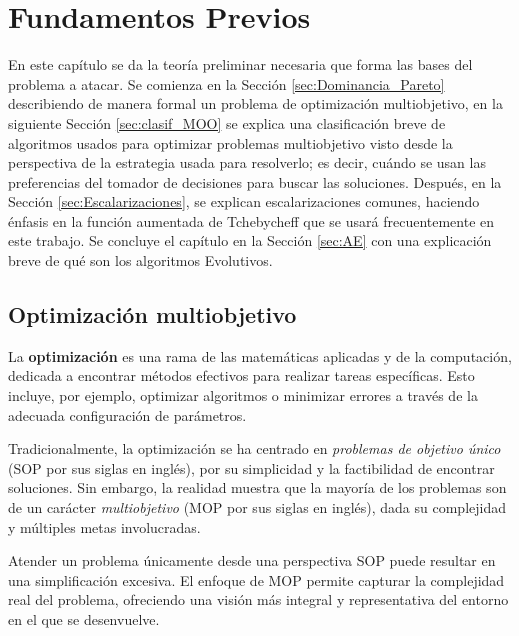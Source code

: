 

\chapter{Fundamentos Previos}

En este capítulo se da la teoría preliminar necesaria que forma las bases del problema a atacar. Se comienza en la Sección \ref{sec:Dominancia_Pareto} describiendo de manera formal un problema de optimización multiobjetivo, en la siguiente Sección \ref{sec:clasif_MOO} se explica una clasificación breve de algoritmos usados para optimizar problemas multiobjetivo visto desde la perspectiva de la estrategia usada para resolverlo; es decir, cuándo se usan las preferencias del tomador de decisiones para buscar las soluciones. Después, en la Sección \ref{sec:Escalarizaciones}, se explican escalarizaciones comunes, haciendo énfasis en la función aumentada de Tchebycheff que se usará frecuentemente en este trabajo. 
Se concluye el capítulo en la Sección \ref{sec:AE} con una explicación breve de qué son los algoritmos Evolutivos.



\section{Optimización multiobjetivo} \label{sec:MOO}



La \textbf{optimización} es una rama de las matemáticas aplicadas y de la computación, dedicada a encontrar métodos efectivos para realizar tareas específicas. Esto incluye, por ejemplo, optimizar algoritmos o minimizar errores a través de la adecuada configuración de parámetros.

Tradicionalmente, la optimización se ha centrado en \textit{problemas de objetivo único} (SOP por sus siglas en inglés), por su simplicidad y la factibilidad de encontrar soluciones. Sin embargo, la realidad muestra que la mayoría de los problemas son de un carácter \textit{multiobjetivo} (MOP por sus siglas en inglés), dada su complejidad y múltiples metas involucradas.

Atender un problema únicamente desde una perspectiva SOP puede resultar en una simplificación excesiva. El enfoque de MOP permite capturar la complejidad real del problema, ofreciendo una visión más integral y representativa del entorno en el que se desenvuelve.

